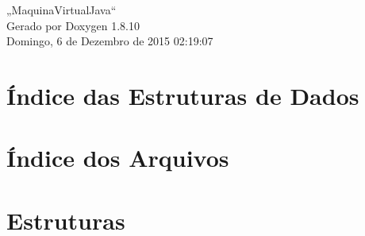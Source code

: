 \documentclass[twoside]{book}
\newcommand{\+}{\discretionary{\mbox{\scriptsize$\hookleftarrow$}}{}{}}
\newcommand{\clearemptydoublepage}{%
  \newpage{\pagestyle{empty}\cleardoublepage}%
}
\begin{document}
\hypersetup{pageanchor=false,
             bookmarks=true,
             bookmarksnumbered=true,
             pdfencoding=unicode
            }
\begin{titlepage}
\vspace*{7cm}
\begin{center}%
{\Large „\+Maquina\+Virtual\+Java“ }\\
\vspace*{1cm}
{\large Gerado por Doxygen 1.8.10}\\
\vspace*{0.5cm}
{\small Domingo, 6 de Dezembro de 2015 02:19:07}\\
\end{center}
\end{titlepage}
\clearemptydoublepage
\tableofcontents
\clearemptydoublepage
{}
\hypersetup{pageanchor=true}

\chapter{Índice das Estruturas de Dados}

\chapter{Índice dos Arquivos}

\chapter{Estruturas}
























\end{document}

